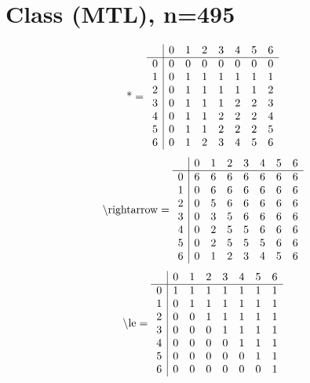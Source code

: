 \documentclass[11pt]{article}
\begin{document}
\section{Class (MTL), n=495}
\[\text{*} = 
\begin{array}{r | r r r r r r r}
 & 0 & 1 & 2 & 3 & 4 & 5 & 6 \\ \hline
0 & 0 & 0 & 0 & 0 & 0 & 0 & 0 \\
1 & 0 & 1 & 1 & 1 & 1 & 1 & 1 \\
2 & 0 & 1 & 1 & 1 & 1 & 1 & 2 \\
3 & 0 & 1 & 1 & 1 & 2 & 2 & 3 \\
4 & 0 & 1 & 1 & 2 & 2 & 2 & 4 \\
5 & 0 & 1 & 1 & 2 & 2 & 2 & 5 \\
6 & 0 & 1 & 2 & 3 & 4 & 5 & 6 \\
\end{array}
\]
\[\text{\textbackslash rightarrow} = 
\begin{array}{r | r r r r r r r}
 & 0 & 1 & 2 & 3 & 4 & 5 & 6 \\ \hline
0 & 6 & 6 & 6 & 6 & 6 & 6 & 6 \\
1 & 0 & 6 & 6 & 6 & 6 & 6 & 6 \\
2 & 0 & 5 & 6 & 6 & 6 & 6 & 6 \\
3 & 0 & 3 & 5 & 6 & 6 & 6 & 6 \\
4 & 0 & 2 & 5 & 5 & 6 & 6 & 6 \\
5 & 0 & 2 & 5 & 5 & 5 & 6 & 6 \\
6 & 0 & 1 & 2 & 3 & 4 & 5 & 6 \\
\end{array}
\]
\[\text{\textbackslash le} = 
\begin{array}{r | r r r r r r r}
 & 0 & 1 & 2 & 3 & 4 & 5 & 6 \\ \hline
0 & 1 & 1 & 1 & 1 & 1 & 1 & 1 \\
1 & 0 & 1 & 1 & 1 & 1 & 1 & 1 \\
2 & 0 & 0 & 1 & 1 & 1 & 1 & 1 \\
3 & 0 & 0 & 0 & 1 & 1 & 1 & 1 \\
4 & 0 & 0 & 0 & 0 & 1 & 1 & 1 \\
5 & 0 & 0 & 0 & 0 & 0 & 1 & 1 \\
6 & 0 & 0 & 0 & 0 & 0 & 0 & 1 \\
\end{array}
\]
\end{document}

